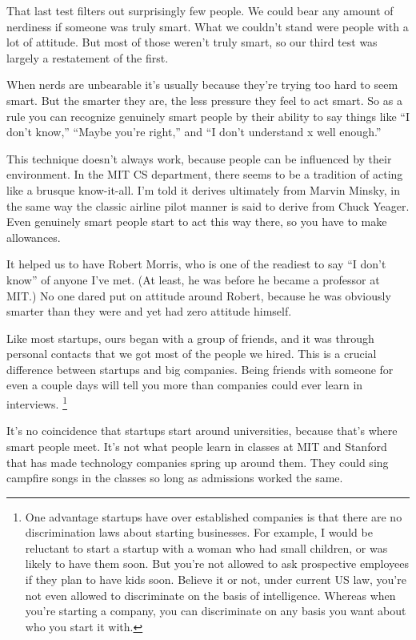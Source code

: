 \documentclass[12pt]{book}
\begin{document}
That last test filters out surprisingly few people. We could bear any
amount of nerdiness if someone was truly smart. What we couldn't stand
were people with a lot of attitude. But most of those weren't truly
smart, so our third test was largely a restatement of the first.

When nerds are unbearable it's usually because they're trying too hard
to seem smart. But the smarter they are, the less pressure they feel to
act smart. So as a rule you can recognize genuinely smart people by
their ability to say things like ``I don't know,'' ``Maybe you're
right,'' and ``I don't understand x well enough.''

This technique doesn't always work, because people can be influenced by
their environment. In the MIT CS department, there seems to be a
tradition of acting like a brusque know-it-all. I'm told it derives
ultimately from Marvin Minsky, in the same way the classic airline pilot
manner is said to derive from Chuck Yeager. Even genuinely smart people
start to act this way there, so you have to make allowances.

It helped us to have Robert Morris, who is one of the readiest to say
``I don't know'' of anyone I've met. (At least, he was before he became
a professor at MIT.) No one dared put on attitude around Robert, because
he was obviously smarter than they were and yet had zero attitude
himself.

Like most startups, ours began with a group of friends, and it was
through personal contacts that we got most of the people we hired. This
is a crucial difference between startups and big companies. Being
friends with someone for even a couple days will tell you more than
companies could ever learn in interviews. \footnote{One advantage startups have over established companies is that
there are no discrimination laws about starting businesses. For example,
I would be reluctant to start a startup with a woman who had small
children, or was likely to have them soon. But you're not allowed to ask
prospective employees if they plan to have kids soon. Believe it or not,
under current US law, you're not even allowed to discriminate on the
basis of intelligence. Whereas when you're starting a company, you can
discriminate on any basis you want about who you start it with.}

It's no coincidence that startups start around universities, because
that's where smart people meet. It's not what people learn in classes at
MIT and Stanford that has made technology companies spring up around
them. They could sing campfire songs in the classes so long as
admissions worked the same.
\end{document}
